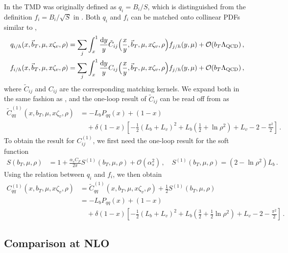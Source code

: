 \documentclass[11pt,a4paper]{article}
\newcommand{\df}{\mathrm{d}}
\newcommand{\cO}{\mathcal{O}}
\newcommand{\nn}{\nonumber}
\newcommand{\as}{\alpha_s}
\newcommand{\LQCD}{\Lambda_\mathrm{QCD}}
\newcommand{\bt}{\vec b_T}
\begin{document}
In  the TMD was originally defined as $q_i=B_i/S$, which is distinguished from the definition $f_i=B_i/\sqrt{S}$ in .
Both $q_i$ and $f_i$ can be matched onto collinear PDFs similar to ,
\begin{align} \label{eq:app:tmd_matching_JMY}
 q_{i/h}(x, \bt, \mu, x \zeta_v, \rho) &
 = \sum_j \int_x^1 \frac{\df y}{y} \tilde C_{ij}\Bigl(\frac{x}{y}, \bt, \mu,  x \zeta_v, \rho\Bigr) f_{j/h}(y, \mu) + \cO(b_T \LQCD)
\,,\nn\\
 f_{i/h}(x, \bt, \mu, x \zeta_v, \rho) &
 = \sum_j \int_x^1 \frac{\df y}{y} C_{ij}\Bigl(\frac{x}{y}, \bt, \mu,  x \zeta_v, \rho\Bigr) f_{j/h}(y, \mu) + \cO(b_T \LQCD)
\,,\end{align}
where $\tilde C_{ij}$ and $C_{ij}$ are the corresponding matching kernels.
We expand both in the same fashion as ,
and the one-loop result of $\tilde C_{ij}$ can be read off from  as
\begin{align} \label{eq:app:tmd_JMY_nlo_1}
 \tilde C_{qq}^{(1)}(x, b_T, \mu, x \zeta_v, \rho) &
 = - L_b P_{qq}(x) + (1-x)
 \\\nn &\quad
   + \delta(1-x) \left[ - \frac12 \left( L_b + L_v \right)^2  + L_b \left( \frac12 + \ln\rho^2\right) + L_v  - 2 - \frac{\pi^2}{2} \right]
\,.\end{align}
To obtain the result for $C_{ij}^{(1)}$, we first need the one-loop result for the soft function~\cite{Ji:2004wu}
\begin{align} \label{eq:app:soft_JMY_nlo}
 S(b_T, \mu, \rho) &
 = 1 + \frac{\as C_F}{2\pi} S^{(1)}(b_T, \mu, \rho) + \cO(\as^2)
\,,\quad
 S^{(1)}(b_T, \mu, \rho) = (2-\ln\rho^2) L_b
\,.\end{align}
Using the relation between $q_i$ and $f_i$, we then obtain
\begin{align} \label{eq:app:tmd_JMY_nlo_2}
 C_{qq}^{(1)}(x, b_T, \mu, x \zeta_v, \rho) &
 = \tilde C_{qq}^{(1)}(x, b_T, \mu, x \zeta_v, \rho) + \frac12 S^{(1)}(b_T, \mu, \rho)
 \nn\\&
 = - L_b P_{qq}(x) + (1-x)
 \\\nn &\quad
   + \delta(1-x) \left[ - \frac12 \left( L_b + L_v \right)^2  + L_b \left( \frac32 + \frac12 \ln\rho^2 \right) + L_v  - 2 - \frac{\pi^2}{2} \right]
\,.\end{align}

\subsection{Comparison at NLO}
\label{sec:nlo-compare}
\end{document}
